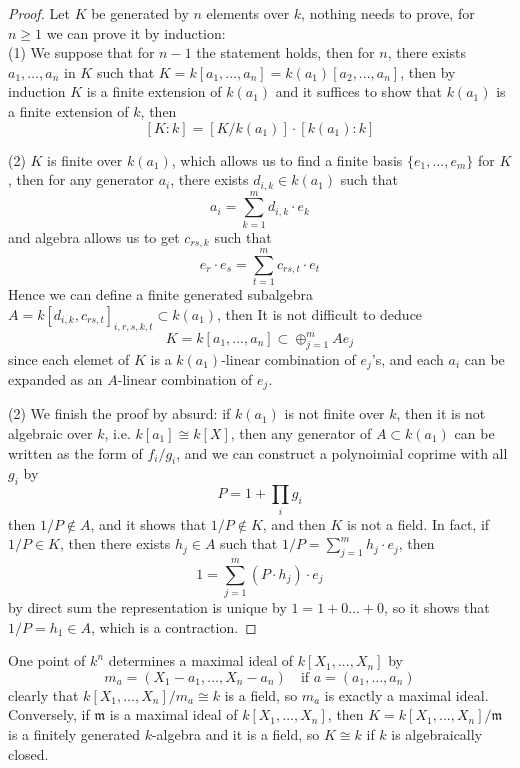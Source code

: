 \begin{proof}
    Let \(K\) be generated by \(n\) elements over \(k\), nothing needs to prove, for \(n \geq 1\) we can prove it by induction:\\

    (1) We suppose that for \(n-1\) the statement holds, then for \(n\), there exists \(a_1,\dots,a_n\) in \(K\) such that \(K= k[a_1,...,a_n] = k(a_1)[a_2,...,a_n]\), then by induction \(K\) is a finite extension of \(k(a_1)\) and it suffices to show that \(k(a_1)\) is a finite extension of \(k\), then
    \[[K:k] = [K/k(a_1)] \cdot [k(a_1):k]\]

    (2) \(K\) is finite over \(k(a_1)\), which allows us to find a finite basis \(\{e_1,...,e_m\}\) for \(K\), then for any generator \(a_i\), there exists \(d_{i,k} \in k(a_1)\) such that
    \[a_i  = \sum_{k=1}^{m}d_{i,k}\cdot e_k\]
    and algebra allows us to get \(c_{rs,k}\) such that
    \[e_r \cdot e_s = \sum_{t=1}^m c_{rs,t} \cdot e_t\]
    Hence we can define a finite generated subalgebra \(A = k[d_{i,k},c_{rs,t}]_{i,r,s,k,t} \subset k(a_1)\), then It is not difficult to deduce
    \[K = k[a_1,...,a_n] \subset \oplus_{j=1}^m Ae_j\]
    since each elemet of \(K\) is a \(k(a_1)\)-linear combination of \(e_j\)'s, and each \(a_i\) can be expanded as an \(A\)-linear combination of \(e_j\).

    (2) We finish the proof by absurd: if \(k(a_1)\) is not finite over \(k\), then it is not algebraic over \(k\), i.e. \(k[a_1] \cong k[X]\), then any generator of \(A \subset k(a_1)\) can be written as the form of \(f_i/g_i\), and we can construct a polynoimial coprime with all \(g_i\) by
    \[P = 1 + \prod_{i}g_i\]
    then \(1/P \notin A\), and it shows that \(1/P \notin K\), and then \(K\) is not a field. In fact, if \(1/P \in K\), then there exists \(h_j \in A\) such that \(1/P = \sum_{j=1}^{m}h_j \cdot e_j\), then
    \[1 = \sum_{j=1}^m (P \cdot h_j) \cdot e_j\]
    by direct sum the representation is unique by \(1 = 1+0...+0\), so it shows that \(1/P = h_1 \in A\), which is a contraction.
    
\end{proof}

\begin{remark}
    One point of \(k^n\) determines a maximal ideal of \(k[X_1,...,X_n]\) by
    \[m_a = (X_1-a_1,\dots,X_n-a_n)  \quad \text{if } a = (a_1,\dots,a_n)\]
    clearly that \(k[X_1,\dots,X_n]/m_a \cong k\) is a field, so \(m_a\) is exactly a maximal ideal. Conversely, if \(\mathfrak{m}\) is a maximal ideal of \(k[X_1,...,X_n]\), then \(K = k[X_1,...,X_n]/\mathfrak{m}\) is a finitely generated \(k\)-algebra and it is a field, so \(K \cong k\) if \(k\) is algebraically closed.
\end{remark}

